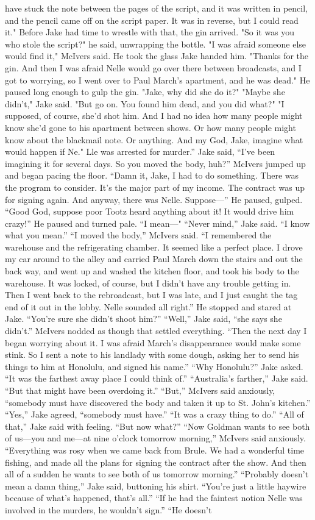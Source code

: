 \documentclass{novel}
\begin{document}
have stuck the note between the pages of the script, and it was written in pencil, and the pencil came off on the script paper. It was in reverse, but I could read it." Before Jake had time to wrestle with that, the gin arrived. "So it was you who stole the script?" he said, unwrapping the bottle. "I was afraid someone else would find it," McIvers said. He took the glass Jake handed him. "Thanks for the gin. And then I was afraid Nelle would go over there between broadcasts, and I got to worrying, so I went over to Paul March's apartment, and he was dead." He paused long enough to gulp the gin. "Jake, why did she do it?" "Maybe she didn't," Jake said. "But go on. You found him dead, and you did what?" "I supposed, of course, she'd shot him. And I had no idea how many people might know she'd gone to his apartment between shows. Or how many people might know about the blackmail note. Or anything. And my God, Jake, imagine what would happen if Ne." Lle was arrested for murder.” Jake said, “I’ve been imagining it for several days. So you moved the body, huh?” McIvers jumped up and began pacing the floor. “Damn it, Jake, I had to do something. There was the program to consider. It’s the major part of my income. The contract was up for signing again. And anyway, there was Nelle. Suppose—” He paused, gulped. “Good God, suppose poor Tootz heard anything about it! It would drive him crazy!” He paused and turned pale. “I mean—" “Never mind,” Jake said. “I know what you mean.” “I moved the body,” McIvers said. “I remembered the warehouse and the refrigerating chamber. It seemed like a perfect place. I drove my car around to the alley and carried Paul March down the stairs and out the back way, and went up and washed the kitchen floor, and took his body to the warehouse. It was locked, of course, but I didn’t have any trouble getting in. Then I went back to the rebroadcast, but I was late, and I just caught the tag end of it out in the lobby. Nelle sounded all right.” He stopped and stared at Jake. “You’re sure she didn’t shoot him?” “Well,” Jake said, “she says she didn’t.” McIvers nodded as though that settled everything. “Then the next day I began worrying about it. I was afraid March’s disappearance would make some stink. So I sent a note to his landlady with some dough, asking her to send his things to him at Honolulu, and signed his name.” “Why Honolulu?” Jake asked. “It was the farthest away place I could think of.” “Australia’s farther,” Jake said. “But that might have been overdoing it.” “But,” McIvers said anxiously, “somebody must have discovered the body and taken it up to St. John’s kitchen.” “Yes,” Jake agreed, “somebody must have.” “It was a crazy thing to do.” “All of that,” Jake said with feeling. “But now what?” “Now Goldman wants to see both of us—you and me—at nine o’clock tomorrow morning,” McIvers said anxiously. “Everything was rosy when we came back from Brule. We had a wonderful time fishing, and made all the plans for signing the contract after the show. And then all of a sudden he wants to see both of us tomorrow morning.” “Probably doesn’t mean a damn thing,” Jake said, buttoning his shirt. “You’re just a little haywire because of what’s happened, that’s all.” “If he had the faintest notion Nelle was involved in the murders, he wouldn’t sign.” “He doesn’t 
\end{document}
